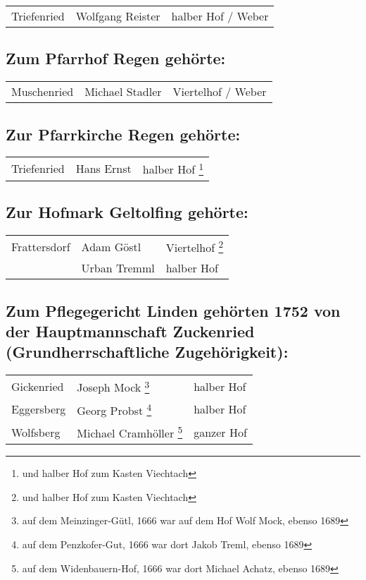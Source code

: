 \documentclass{book}
\begin{document}
\begin{longtable}{l|l|l}
Triefenried & Wolfgang Reister & halber Hof / Weber\\
\end{longtable}

\subsection{Zum Pfarrhof Regen gehörte:}

\begin{longtable}{l|l|l}
Muschenried & Michael Stadler & Viertelhof / Weber\\
\end{longtable}

\subsection{Zur Pfarrkirche Regen gehörte:}

\begin{longtable}{l|l|l}
Triefenried & Hans Ernst & halber Hof \footnote{und halber Hof zum
Kasten Viechtach}\\
\end{longtable}

\subsection{Zur Hofmark Geltolfing gehörte:}

\begin{longtable}{l|l|l}
Frattersdorf & Adam Göstl & Viertelhof \footnote{und halber Hof zum
Kasten Viechtach}\\

& Urban Tremml & halber Hof\\
\end{longtable}

\subsection{Zum Pflegegericht Linden gehörten 1752
\protect\footnotemark{}\protect{} von der Hauptmannschaft Zuckenried
(Grundherrschaftliche Zugehörigkeit):}

\begin{longtable}{l|l|l}
Gickenried & Joseph Mock \footnote{auf dem Meinzinger-Gütl, 1666 war auf
dem Hof Wolf Mock, ebenso 1689} & halber Hof\\

Eggersberg & Georg Probst \footnote{auf dem Penzkofer-Gut, 1666 war dort
Jakob Treml, ebenso 1689} & halber Hof\\

Wolfsberg & Michael Cramhöller \footnote{auf dem Widenbauern-Hof, 1666
war dort Michael Achatz, ebenso 1689} & ganzer Hof\\
\end{longtable}
\end{document}
